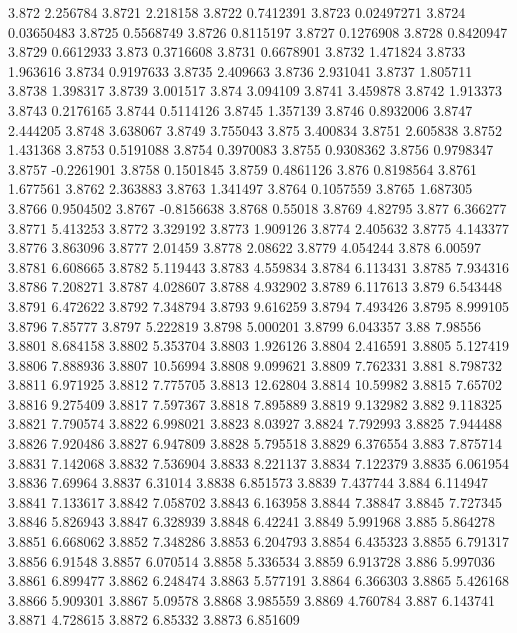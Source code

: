 3.872  2.256784
3.8721  2.218158
3.8722  0.7412391
3.8723  0.02497271
3.8724  0.03650483
3.8725  0.5568749
3.8726  0.8115197
3.8727  0.1276908
3.8728  0.8420947
3.8729  0.6612933
3.873  0.3716608
3.8731  0.6678901
3.8732  1.471824
3.8733  1.963616
3.8734  0.9197633
3.8735  2.409663
3.8736  2.931041
3.8737  1.805711
3.8738  1.398317
3.8739  3.001517
3.874  3.094109
3.8741  3.459878
3.8742  1.913373
3.8743  0.2176165
3.8744  0.5114126
3.8745  1.357139
3.8746  0.8932006
3.8747  2.444205
3.8748  3.638067
3.8749  3.755043
3.875  3.400834
3.8751  2.605838
3.8752  1.431368
3.8753  0.5191088
3.8754  0.3970083
3.8755  0.9308362
3.8756  0.9798347
3.8757  -0.2261901
3.8758  0.1501845
3.8759  0.4861126
3.876  0.8198564
3.8761  1.677561
3.8762  2.363883
3.8763  1.341497
3.8764  0.1057559
3.8765  1.687305
3.8766  0.9504502
3.8767  -0.8156638
3.8768  0.55018
3.8769  4.82795
3.877  6.366277
3.8771  5.413253
3.8772  3.329192
3.8773  1.909126
3.8774  2.405632
3.8775  4.143377
3.8776  3.863096
3.8777  2.01459
3.8778  2.08622
3.8779  4.054244
3.878  6.00597
3.8781  6.608665
3.8782  5.119443
3.8783  4.559834
3.8784  6.113431
3.8785  7.934316
3.8786  7.208271
3.8787  4.028607
3.8788  4.932902
3.8789  6.117613
3.879  6.543448
3.8791  6.472622
3.8792  7.348794
3.8793  9.616259
3.8794  7.493426
3.8795  8.999105
3.8796  7.85777
3.8797  5.222819
3.8798  5.000201
3.8799  6.043357
3.88  7.98556
3.8801  8.684158
3.8802  5.353704
3.8803  1.926126
3.8804  2.416591
3.8805  5.127419
3.8806  7.888936
3.8807  10.56994
3.8808  9.099621
3.8809  7.762331
3.881  8.798732
3.8811  6.971925
3.8812  7.775705
3.8813  12.62804
3.8814  10.59982
3.8815  7.65702
3.8816  9.275409
3.8817  7.597367
3.8818  7.895889
3.8819  9.132982
3.882  9.118325
3.8821  7.790574
3.8822  6.998021
3.8823  8.03927
3.8824  7.792993
3.8825  7.944488
3.8826  7.920486
3.8827  6.947809
3.8828  5.795518
3.8829  6.376554
3.883  7.875714
3.8831  7.142068
3.8832  7.536904
3.8833  8.221137
3.8834  7.122379
3.8835  6.061954
3.8836  7.69964
3.8837  6.31014
3.8838  6.851573
3.8839  7.437744
3.884  6.114947
3.8841  7.133617
3.8842  7.058702
3.8843  6.163958
3.8844  7.38847
3.8845  7.727345
3.8846  5.826943
3.8847  6.328939
3.8848  6.42241
3.8849  5.991968
3.885  5.864278
3.8851  6.668062
3.8852  7.348286
3.8853  6.204793
3.8854  6.435323
3.8855  6.791317
3.8856  6.91548
3.8857  6.070514
3.8858  5.336534
3.8859  6.913728
3.886  5.997036
3.8861  6.899477
3.8862  6.248474
3.8863  5.577191
3.8864  6.366303
3.8865  5.426168
3.8866  5.909301
3.8867  5.09578
3.8868  3.985559
3.8869  4.760784
3.887  6.143741
3.8871  4.728615
3.8872  6.85332
3.8873  6.851609
